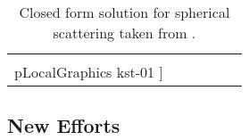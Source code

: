 \begin{table}[htp]
\begin{center}
\begin{tabular}{cccccc}
	\texttt{[image:  \\pLocalGraphics kst-01 ]} &
\end{tabular}
\end{center}
\caption{Closed form solution for spherical scattering taken from \cite[p. 123]{knott2004radar}.}
\label{tab:obj}
\end{table}%


{\scriptsize{

}}

{\scriptsize{

}}


\subsection{New Efforts}



\endinput  %
